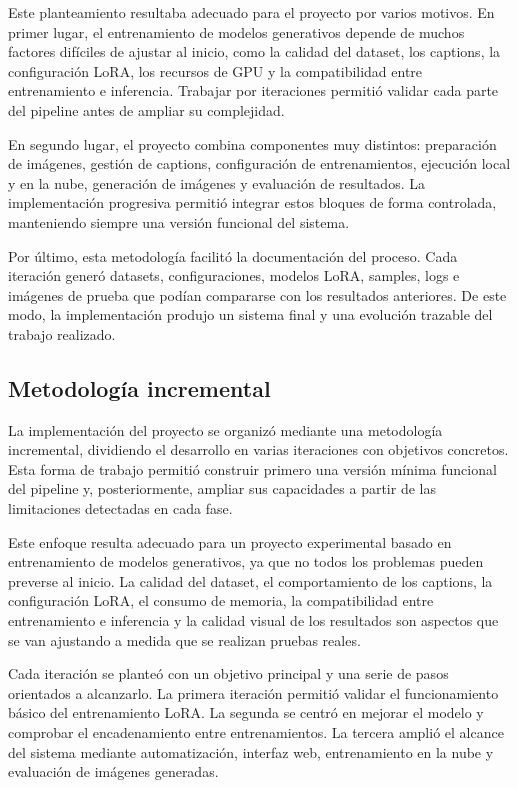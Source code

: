 \documentclass[a4paper,11pt,titlepage]{scrbook}
\begin{document}
\medskip

Este planteamiento resultaba adecuado para el proyecto por varios motivos. En primer lugar, el entrenamiento de modelos generativos depende de muchos factores difíciles de ajustar al inicio, como la calidad del dataset, los captions, la configuración LoRA, los recursos de GPU y la compatibilidad entre entrenamiento e inferencia. Trabajar por iteraciones permitió validar cada parte del pipeline antes de ampliar su complejidad.

\medskip

En segundo lugar, el proyecto combina componentes muy distintos: preparación de imágenes, gestión de captions, configuración de entrenamientos, ejecución local y en la nube, generación de imágenes y evaluación de resultados. La implementación progresiva permitió integrar estos bloques de forma controlada, manteniendo siempre una versión funcional del sistema.

\medskip

Por último, esta metodología facilitó la documentación del proceso. Cada iteración generó datasets, configuraciones, modelos LoRA, samples, logs e imágenes de prueba que podían compararse con los resultados anteriores. De este modo, la implementación produjo un sistema final y una evolución trazable del trabajo realizado.

\subsection{Metodología incremental}

La implementación del proyecto se organizó mediante una metodología incremental, dividiendo el desarrollo en varias iteraciones con objetivos concretos. Esta forma de trabajo permitió construir primero una versión mínima funcional del pipeline y, posteriormente, ampliar sus capacidades a partir de las limitaciones detectadas en cada fase.

\medskip

Este enfoque resulta adecuado para un proyecto experimental basado en entrenamiento de modelos generativos, ya que no todos los problemas pueden preverse al inicio. La calidad del dataset, el comportamiento de los captions, la configuración LoRA, el consumo de memoria, la compatibilidad entre entrenamiento e inferencia y la calidad visual de los resultados son aspectos que se van ajustando a medida que se realizan pruebas reales.

\medskip

Cada iteración se planteó con un objetivo principal y una serie de pasos orientados a alcanzarlo. La primera iteración permitió validar el funcionamiento básico del entrenamiento LoRA. La segunda se centró en mejorar el modelo y comprobar el encadenamiento entre entrenamientos. La tercera amplió el alcance del sistema mediante automatización, interfaz web, entrenamiento en la nube y evaluación de imágenes generadas.
\end{document}
